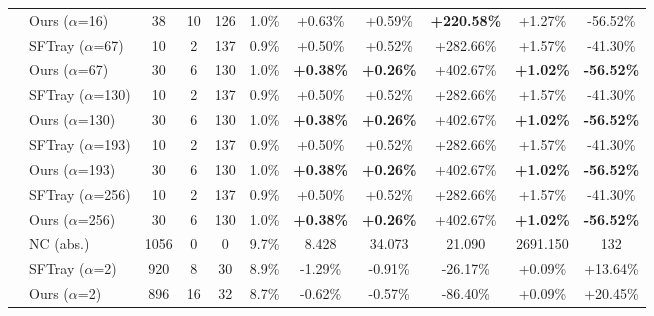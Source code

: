 \begin{table}[t]
{\begin{tabular}{ll|cccc|ccc|cc}
 & Ours ($\alpha$=16) & 38 & 10 & 126 & 1.0\% & +0.63\% & +0.59\% & \textbf{+220.58\%} & +1.27\% & -56.52\% \\

\addlinespace[0.3em]

 & SFTray ($\alpha$=67) & 10 & 2 & 137 & 0.9\% & +0.50\% & +0.52\% & +282.66\% & +1.57\% & -41.30\% \\

 & Ours ($\alpha$=67) & 30 & 6 & 130 & 1.0\% & \textbf{+0.38\%} & \textbf{+0.26\%} & +402.67\% & \textbf{+1.02\%} & \textbf{-56.52\%} \\

\addlinespace[0.3em]

 & SFTray ($\alpha$=130) & 10 & 2 & 137 & 0.9\% & +0.50\% & +0.52\% & +282.66\% & +1.57\% & -41.30\% \\

 & Ours ($\alpha$=130) & 30 & 6 & 130 & 1.0\% & \textbf{+0.38\%} & \textbf{+0.26\%} & +402.67\% & \textbf{+1.02\%} & \textbf{-56.52\%} \\

\addlinespace[0.3em]

 & SFTray ($\alpha$=193) & 10 & 2 & 137 & 0.9\% & +0.50\% & +0.52\% & +282.66\% & +1.57\% & -41.30\% \\

 & Ours ($\alpha$=193) & 30 & 6 & 130 & 1.0\% & \textbf{+0.38\%} & \textbf{+0.26\%} & +402.67\% & \textbf{+1.02\%} & \textbf{-56.52\%} \\

\addlinespace[0.3em]

 & SFTray ($\alpha$=256) & 10 & 2 & 137 & 0.9\% & +0.50\% & +0.52\% & +282.66\% & +1.57\% & -41.30\% \\

 & Ours ($\alpha$=256) & 30 & 6 & 130 & 1.0\% & \textbf{+0.38\%} & \textbf{+0.26\%} & +402.67\% & \textbf{+1.02\%} & \textbf{-56.52\%} \\

\addlinespace[0.3em]

\midrule

\multirow{17}{*}{riscv32i} & NC (abs.) & 1056 & 0 & 0 & 9.7\% & 8.428 & 34.073 & 21.090 & 2691.150 & 132 \\

\addlinespace[0.4em]

 & SFTray ($\alpha$=2) & 920 & 8 & 30 & 8.9\% & -1.29\% & -0.91\% & -26.17\% & +0.09\% & +13.64\% \\

 & Ours ($\alpha$=2) & 896 & 16 & 32 & 8.7\% & -0.62\% & -0.57\% & -86.40\% & +0.09\% & +20.45\% \\


\end{tabular}}
\end{table}
